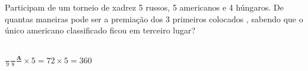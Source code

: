 \begin{ex}
 Participam de um torneio de xadrez 5 russos, 5 americanos e 4 húngaros. De quantas maneiras pode ser a premiação dos 3 primeiros colocados , sabendo que o único americano classificado ficou em terceiro lugar?
  \begin{sol}
      \phantom{A} \\
  $\frac{\phantom{A}}{9}\frac{\phantom{A}}{8}\frac{\textbf{A}}{\phantom{A}}\times5=72\times5=360$
  \end{sol}
\end{ex}